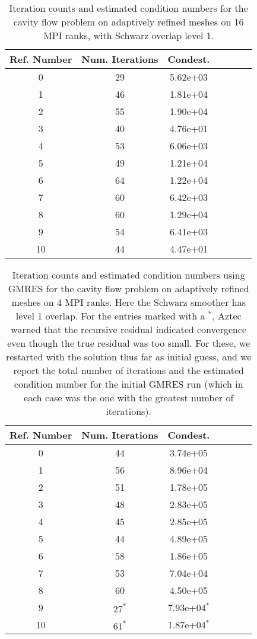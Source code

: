 \documentclass[11pt]{amsart}
\begin{document}
\begin{table}
\begin{tabular}{ c  c  c  c  c  c c}
Ref. Number	&Num. Iterations	&Condest.\\
\hline
0	&29	&5.62e+03\\
1	&46	&1.81e+04\\
2	&55	&1.90e+04\\
3	&40	&4.76e+01\\
4	&53	&6.06e+03\\
5	&49	&1.21e+04\\
6	&64	&1.22e+04\\
7	&60	&6.42e+03\\
8	&60	&1.29e+04\\
9	&54	&6.41e+03\\
10 	&44	&4.47e+01\\
\end{tabular}
\caption{Iteration counts and estimated condition numbers for the cavity flow problem on adaptively refined meshes on 16 MPI ranks, with Schwarz overlap level 1.}
\label{table:stokesConditioningStudyAdaptiveMeshes16RanksOverlap1}
\end{table}

\begin{table}
\begin{tabular}{ c  c  c  c  c  c c}
Ref. Number	&Num. Iterations	&Condest.\\
\hline
0	&44	&3.74e+05\\
1	&56	&8.96e+04\\
2	&51	&1.78e+05\\
3	&48	&2.83e+05\\
4	&45	&2.85e+05\\
5	&44	&4.89e+05\\
6	&58	&1.86e+05\\
7	&53	&7.04e+04\\
8	&60	&4.50e+05\\
9	&$27^*$	&7.93e+04$^*$\\
10 	&$61^*$	&1.87e+04$^*$\\
\end{tabular}
\caption{Iteration counts and estimated condition numbers using GMRES for the cavity flow problem on adaptively refined meshes on 4 MPI ranks.  Here the Schwarz smoother has level 1 overlap.  For the entries marked with a $^*$, Aztec warned that the recursive residual indicated convergence even though the true residual was too small.  For these, we restarted with the solution thus far as initial guess, and we report the total number of iterations and the estimated condition number for the initial GMRES run (which in each case was the one with the greatest number of iterations).}
\label{table:stokesConditioningStudyAdaptiveMeshes4RanksGMRES}
\end{table}
\end{document}
